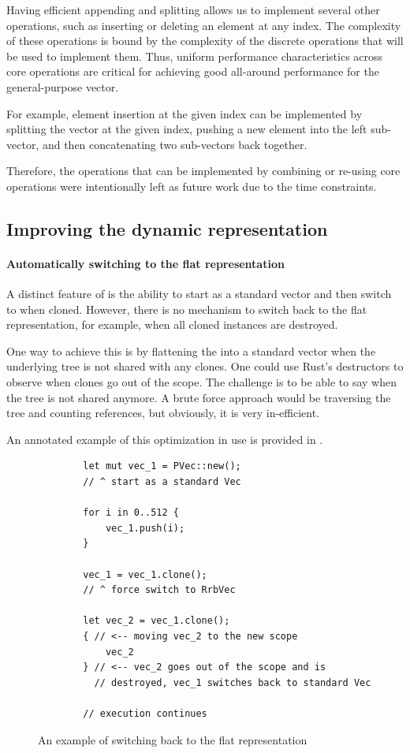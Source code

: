 Having efficient appending and splitting allows us to implement several other operations, such as inserting or deleting an element at any index. The complexity of these operations is bound by the complexity of the discrete operations that will be used to implement them. Thus, uniform performance characteristics across core operations are critical for achieving good all-around performance for the general-purpose vector.

For example, element insertion at the given index can be implemented by splitting the vector at the given index, pushing a new element into the left sub-vector, and then concatenating two sub-vectors back together.

Therefore, the operations that can be implemented by combining or re-using core operations were intentionally left as future work due to the time constraints.

\subsection{Improving the dynamic representation}

\paragraph{Automatically switching to the flat representation}
A distinct feature of \pvec{} is the ability to start as a standard vector and then switch to \rrbvec{} when cloned. However, there is no mechanism to switch back to the flat representation, for example, when all cloned instances are destroyed.

One way to achieve this is by flattening the \rrbtree{} into a standard vector when the underlying tree is not shared with any clones. One could use Rust's destructors to observe when \pvec{} clones go out of the scope. The challenge is to be able to say when the tree is not shared anymore. A brute force approach would be traversing the tree and counting references, but obviously, it is very in-efficient.

An annotated example of this optimization in use is provided in .

\begin{figure}[H]
    \centering

    \begin{verbatim}
        let mut vec_1 = PVec::new();
        // ^ start as a standard Vec

        for i in 0..512 {
            vec_1.push(i);
        }

        vec_1 = vec_1.clone();
        // ^ force switch to RrbVec

        let vec_2 = vec_1.clone();
        { // <-- moving vec_2 to the new scope
            vec_2
        } // <-- vec_2 goes out of the scope and is
          // destroyed, vec_1 switches back to standard Vec

        // execution continues
    \end{verbatim}

    \caption{An example of switching back to the flat representation}
    \label{fig:switching-to-flat}
\end{figure}

